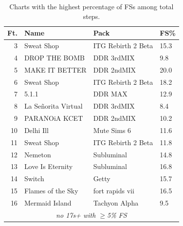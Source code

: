 \documentclass[10pt]{sigplanconf}
\begin{document}
\begin{table}[t]
	\begin{center}
		\small
	\begin{tabular}{r|l|l|l}
		\bf Ft. & \bf Name & \bf Pack & \bf FS\% \\
		\hline
		 3 & Sweat Shop       & ITG Rebirth 2 Beta    & 15.3 \\
		 4 & DROP THE BOMB    & DDR 3rdMIX            &  9.8 \\
		 5 & MAKE IT BETTER   & DDR 2ndMIX            & 20.0 \\
		 6 & Sweat Shop       & ITG Rebirth 2 Beta    & 18.2 \\
		 7 & 5.1.1            & DDR MAX               & 12.9 \\
		 8 & La Se\~{n}orita Virtual & DDR 3rdMIX     &  8.4 \\
		 9 & PARANOiA KCET    & DDR 2ndMIX            & 10.2 \\
		10 & Delhi Ill        & Mute Sims 6           & 11.6 \\
		11 & Sweat Shop       & ITG Rebirth 2 Beta    & 11.8 \\
		12 & Nemeton          & Subluminal            & 14.8 \\
		13 & Love Is Eternity & Subluminal            & 16.8 \\
		14 & Switch           & Getty                 & 15.7 \\
		15 & Flames of the Sky & fort rapids vii      & 16.5 \\
		16 & Mermaid Island   & Tachyon Alpha         &  9.5 \\
		\multicolumn{4}{c}{\em no 17s+ with $\ge$5\% FS} \\
	\end{tabular}
	\end{center}
	\caption{Charts with the highest percentage of FSs among total steps.}
\end{table}
\end{document}

